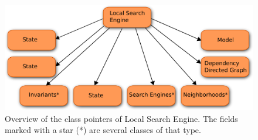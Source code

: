 \begin{figure}[!b]
\begin{center}
\includegraphics[width=0.9\linewidth]{LSE}\caption{Overview of the class pointers of Local Search Engine. The fields 
marked with a star (*) are several classes of that type.} 
\label{fig_lse}
\end{center}
\end{figure}
